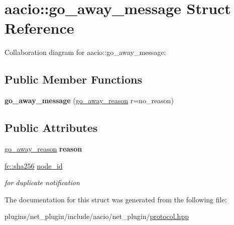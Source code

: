 \hypertarget{structaacio_1_1go__away__message}{}\section{aacio\+:\+:go\+\_\+away\+\_\+message Struct Reference}
\label{structaacio_1_1go__away__message}


Collaboration diagram for aacio\+:\+:go\+\_\+away\+\_\+message\+:
\subsection*{Public Member Functions}
\begin{DoxyCompactItemize}
\item 
\mbox{\label{structaacio_1_1go__away__message_a7f49b52f483836d8c4388e1e79ccd1b0}} 
{\bfseries go\+\_\+away\+\_\+message} (\mbox{\hyperlink{plugins_2net__plugin_2include_2aacio_2net__plugin_2protocol_8hpp_a1b8490273cc36ec0241920722ba18ab4}{go\+\_\+away\+\_\+reason}} r=no\+\_\+reason)
\end{DoxyCompactItemize}
\subsection*{Public Attributes}
\begin{DoxyCompactItemize}
\item 
\mbox{\label{structaacio_1_1go__away__message_afe540bd523e1326459dce6232712d3fa}} 
\mbox{\hyperlink{plugins_2net__plugin_2include_2aacio_2net__plugin_2protocol_8hpp_a1b8490273cc36ec0241920722ba18ab4}{go\+\_\+away\+\_\+reason}} {\bfseries reason}
\item 
\mbox{\label{structaacio_1_1go__away__message_a0e7961fc79f2e381a2b0b279f90a6c9b}} 
\mbox{\hyperlink{classfc_1_1sha256}{fc\+::sha256}} \mbox{\hyperlink{structaacio_1_1go__away__message_a0e7961fc79f2e381a2b0b279f90a6c9b}{node\+\_\+id}}
\begin{DoxyCompactList}\small\item\em for duplicate notification \end{DoxyCompactList}\end{DoxyCompactItemize}


The documentation for this struct was generated from the following file\+:\begin{DoxyCompactItemize}
\item 
plugins/net\+\_\+plugin/include/aacio/net\+\_\+plugin/\mbox{\hyperlink{plugins_2net__plugin_2include_2aacio_2net__plugin_2protocol_8hpp}{protocol.\+hpp}}\end{DoxyCompactItemize}
